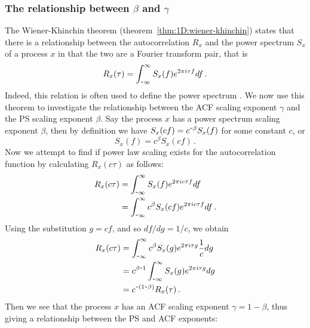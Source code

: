 {{}

\subsubsection{The relationship between $\beta$ and $\gamma$}
\label{subsec:1D:relationships:beta_and_gamma}
{\Red
	
The Wiener-Khinchin theorem (theorem~\ref{thm:1D:wiener-khinchin}) states that there is a relationship between the autocorrelation $R_x$ and the power spectrum $S_x$ of a process $x$ in that the two are a Fourier transform pair, that is
	\begin{equation}
		R_x(\tau) = \int_{\textup{\texttt{-}} \infty}^\infty S_x(f)e^{2\pi i \tau f} df\,.
	\end{equation}
Indeed, this relation is often used to define the power spectrum \citep{chatfield2016analysis}. We now use this theorem to investigate the relationship between the ACF scaling exponent $\gamma$ and the PS scaling exponent $\beta$. Say the process $x$ has a power spectrum scaling exponent $\beta$, then by definition we have $S_x(cf) = c^{\textup{\texttt{-}}\beta}S_x(f)$
for some constant $c$, or
	\begin{equation}
		S_x(f) = c^{\beta}S_x(cf)\,.
	\end{equation}
Now we attempt to find if power law scaling exists for the autocorrelation function by calculating $R_x(c\tau)$ as follows:
	\begin{equation}
	\begin{split}
		R_x(c\tau) &= \int_{\textup{\texttt{-}} \infty}^\infty S_x(f)e^{2\pi i c\tau f} df\\
		&= \int_{\textup{\texttt{-}} \infty}^\infty c^{\beta}S_x(cf)e^{2\pi i c\tau f} df\,.
	\end{split}
	\end{equation}
Using the substitution $g = cf$, and so $df/dg = 1/c$, we obtain
	\begin{equation}
	\begin{split}
	R_x(c\tau) &= \int_{\textup{\texttt{-}} \infty}^\infty c^{\beta}S_x(g)e^{2\pi i \tau g} \frac{1}{c} dg\\
	&= c^{\beta\textup{\texttt{-}} 1}\int_{\textup{\texttt{-}} \infty}^\infty S_x(g)e^{2\pi i \tau g} dg\\
	&= c^{\textup{\texttt{-}}(1\textup{\texttt{-}}\beta)}R_x(\tau)\,.
	\end{split}
	\end{equation}
Then we see that the process $x$ has an ACF scaling exponent $\gamma = 1-\beta$, thus giving a relationship between the PS and ACF exponents:
	\begin{equation}
	\label{eqn:1D:beta-gamma_linear_relation}

\end{equation}}}

